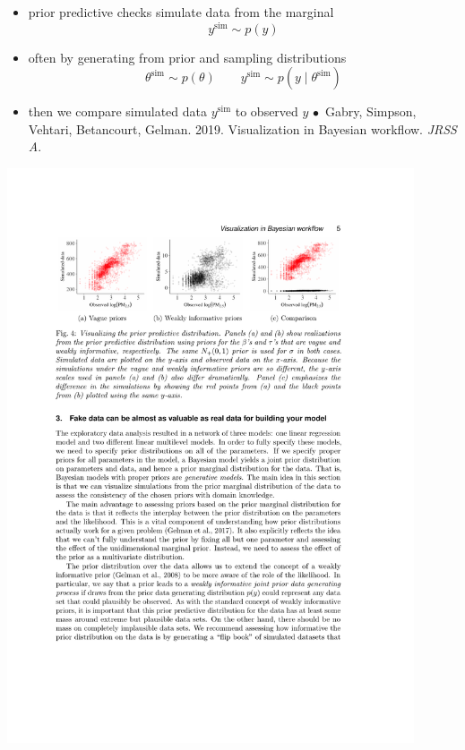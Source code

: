 \documentclass[10pt]{report}
\newcommand{\simvar}[1]{#1^{\textrm{sim}}}
\begin{document}
\begin{itemize}
\item prior predictive checks simulate data from the marginal
  \[
    \simvar{y} \sim p(y)
  \]
\item often by generating from prior and sampling distributions
  \[
    \simvar{\theta} \sim p(\theta)
    \qquad
    \simvar{y} \sim p(y \mid \simvar{\theta})
  \]
\item then we compare simulated data $\simvar{y}$ to observed $y$
  \vfill
  {\footnotesize $\bullet$\ Gabry, Simpson, Vehtari, Betancourt,
    Gelman. 2019. Visualization in Bayesian workflow. \textit{JRSS A}.}
\end{itemize}


\begin{center}
\vspace*{-8pt}
\includegraphics[width=0.9\textwidth]{img/prior-predictive-eg.pdf}
\end{center}
\end{document}
